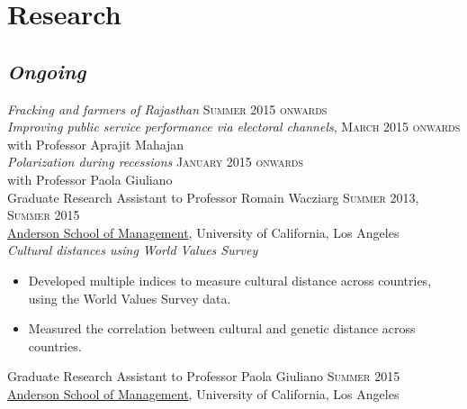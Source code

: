 \documentclass[11pt]{article}
\begin{document}
\section{Research}
\label{sec-2}
\subsection{\textbf{\emph{Ongoing}}}
\label{sec-2-1}
\flushleft
\emph{Fracking and farmers of Rajasthan} \hfill \textsc{\normalsize Summer 2015 onwards}\\
\vspace{0.5em}
\emph{Improving public service performance via electoral channels}, \hfill \textsc{\normalsize March 2015 onwards}\\
with Professor Aprajit Mahajan\\
\vspace{0.5em}
\emph{Polarization during recessions} \hfill \textsc{\normalsize January 2015 onwards}\\
with Professor Paola Giuliano\\
\vspace{0.5em}
Graduate Research Assistant to Professor Romain Wacziarg \hfill
\textsc{\normalsize Summer 2013, Summer 2015}\\
\href{http://www.anderson.ucla.edu/faculty/global-economics-and-management/phd-program}{Anderson School of Management}, University of California, Los Angeles \\
\emph{Cultural distances using World Values Survey}
\begin{itemize}
\item Developed multiple indices to measure cultural distance across countries, using the World Values Survey data.
\item Measured the correlation between cultural and genetic distance across countries.
\end{itemize}
\vspace{0.5em}
Graduate Research Assistant to Professor Paola Giuliano \hfill
\textsc{\normalsize Summer 2015}\\
\href{http://www.anderson.ucla.edu/faculty/global-economics-and-management/phd-program}{Anderson School of Management}, University of California, Los Angeles \\
\vspace{0.5em}
\end{document}
